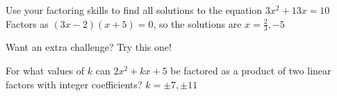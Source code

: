 \documentclass[12pt,twoside,parskip]{handout}
\begin{document}
\newpage

\begin{prob}[exciting]
	Use your factoring skills to find all solutions to the equation $3x^2 + 13x = 10$
	\solution
	Factors as $(3x - 2)(x + 5)=0$, so the solutions are $x=\frac{2}{3}, -5$
\end{prob}

Want an extra challenge?
Try this one!

\begin{prob}[bonus, space=1.5]
	For what values of $k$ can $2x^2+kx+5$ be factored as a product of two linear factors with integer coefficients?
	\solution
	$k=\pm7, \pm 11$
\end{prob}

\end{document}
